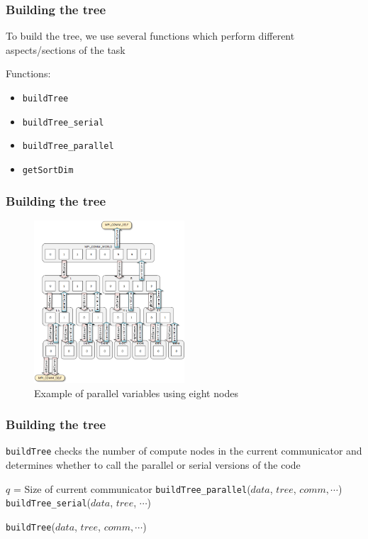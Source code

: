 \documentclass[usernames,dvipsnames]{beamer}
\begin{document}
\begin{frame}
	\frametitle{Building the tree}
	
	To build the tree, we use several functions which perform different aspects/sections of the task
	
	\vspace{10pt}
	
	\begin{block}{Functions:}
		\begin{itemize}
			\item \texttt{buildTree}
			\item \texttt{buildTree\_serial}
			\item \texttt{buildTree\_parallel}
			\item \texttt{getSortDim}
		\end{itemize}
	\end{block}
\end{frame}


\begin{frame}
	\frametitle{Building the tree}
	    \begin{figure}[h!]
       	    \centering
            \includegraphics[width=0.5\textwidth]{images/communicators.png}
            \caption{Example of parallel variables using eight nodes}
            \label{fig:communicators}
        \end{figure}
\end{frame}

\begin{frame}
	\frametitle{Building the tree}
	
	\texttt{buildTree} checks the number of compute nodes in the current communicator and determines whether to call the parallel or serial versions of the code
	
	\vspace{10pt}
	
	\begin{algorithm}[H]
		\begin{algorithmic}[1]
			\STATE $q$ = Size of current communicator
				\STATE \texttt{buildTree\_parallel}($data$, $tree$, $comm, \cdots$)
			\ELSE
				\STATE \texttt{buildTree\_serial}($data$, $tree$, $\cdots$)
			\ENDIF
		\end{algorithmic}
	\caption{\texttt{buildTree}($data$, $tree$, $comm, \cdots$)}
	\end{algorithm}
		
\end{frame}
\end{document}
